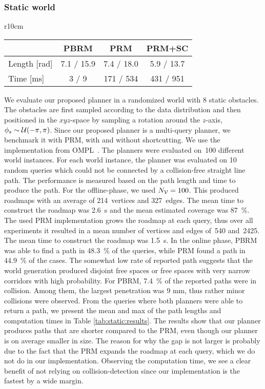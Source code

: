 \documentclass[../main.tex]{subfiles}
\begin{document}
\subsubsection{Static world}
\begin{wraptable}{r}{10cm}
\centering
\caption{Statistics (mean/max) over cases where both planners were successful. Shortcutting is abbreviated as SC.}
\label{tab:static:results}
\begin{tabular}{l ccc}
     					& PBRM & PRM	& 	PRM+SC \\ 
    \midrule
    Length [rad] & 7.1 / 15.9 &  7.4 / 18.0 & 5.9 / 13.7 \\
	Time [ms]&  3 / 9  &	171 /	534	 & 431 / 951 \\
    \bottomrule
\end{tabular}
\end{wraptable}
We evaluate our proposed planner in a randomized world with $8$ static obstacles. The obstacles are first sampled according to the data distribution and then positioned in the $xyz$-space by sampling a rotation around the $z$-axis, $\phi_s \sim \mathcal{U}(-\pi, \pi)$. Since our proposed planner is a multi-query planner, we benchmark it with PRM, with and without shortcutting. We use the implementation from OMPL~\citep{ompl}.  The planners were evaluated on~100 different world instances. For each world instance, the planner was evaluated on 10 random queries which could not be connected by a collision-free straight line path. The performance is measured based on the path length and time to produce the path. For the offline-phase, we used $N_{\mathcal{V}}=100$. This produced roadmaps with an average of 214~vertices and 327~edges. The mean time to construct the roadmap was 2.6~s and the mean estimated coverage was 87~\%. The used PRM implementation grows the roadmap at each query, thus over all experiments it resulted in a mean number of vertices and edges of~540 and~2425. The mean time to construct the roadmap was 1.5~s. In the online phase, PBRM was able to find a path in 48.3~\% of the queries, while PRM found a path in 44.9~\% of the cases. The somewhat low rate of reported path suggests that the world generation produced disjoint free spaces or free spaces with very narrow corridors with high probability. For PBRM, 7.4~\% of the reported paths were in collision. Among them, the largest penetration was 9 mm, thus rather minor collisions were observed. From the queries where both planners were able to return a path, we present the mean and max of the path lengths and computation times in Table \ref{tab:static:results}. The results show that our planner produces paths that are shorter compared to the PRM, even though our planner is on average smaller in size. The reason for why the gap is not larger is probably due to the fact that the PRM expands the roadmap at each query, which we do not do in our implementation. Observing the computation time, we see a clear benefit of not relying on collision-detection since our implementation is the fastest by a wide margin.
\end{document}
